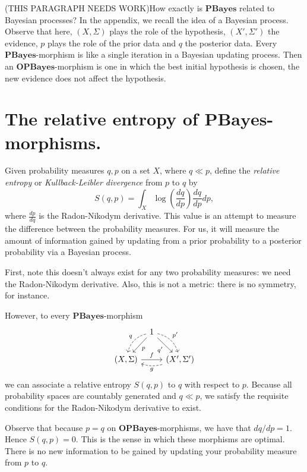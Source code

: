 \documentclass[11pt]{amsart}
\newcommand{\cat}[1]{\mathbf{#1}}
\theoremstyle{remark}
\theoremstyle{definition}
\begin{document}
{\color{red} (THIS PARAGRAPH NEEDS WORK)}How 
exactly is $\cat{PBayes}$ related to 
Bayesian processes? In the 
appendix, we recall the idea of a Bayesian 
process.  Observe that here, 
$(X,\Sigma)$ plays the role of the hypothesis, 
$(X',\Sigma')$ the evidence, $p$ 
plays the role of the prior data and $q$ the 
posterior data. Every $\cat{PBayes}$-morphism 
is like a single iteration in a Bayesian 
updating process. Then an 
$\cat{OPBayes}$-morphism is one in 
which the best initial hypothesis is chosen, 
the new evidence does not affect 
the hypothesis.  


%
\section{The relative entropy of 
$\cat{PBayes}$-morphisms.}
%

Given probability measures $q,p$ on a set $X$, where $q \ll p$, define the \textit{relative entropy} or \textit{Kullback-Leibler divergence} from $p$ to $q$ by
\[
S(q,p) = \int_X \log \left( \frac{dq}{dp} \right) \frac{dq}{dp} dp,
\]
where $\frac{dp}{dq}$ is the Radon-Nikodym derivative. This value is an attempt to measure the difference between the probability measures. For us, it will measure the amount of information gained by updating from a prior probability to a posterior probability via a Bayesian process. 

First, note this doesn't always exist for any two probability measures: we need the Radon-Nikodym derivative.  Also, this is not a metric: there is no symmetry, for instance.  

However, to every $\cat{PBayes}$-morphism 
\[
\begin{tikzcd}[column sep=tiny]
{} & 
{1} \ar[dl,"p"] \ar[dr,swap,"q'"] \ar[dr,bend left=30,dashed,"p'"] 
\ar[dl,bend right=30,dashed,swap,"q"] & 
{} \\
{(X,\Sigma)} \ar[rr,"f"] & 
{} & 
{(X',\Sigma')} \ar[ll,dashed,bend left=15,"g"]
\end{tikzcd}
\]
we can associate a relative entropy $S(q,p)$ to $q$ with respect to $p$.  Because all probability spaces are countably generated and $q \ll p$, we satisfy the requisite conditions for the Radon-Nikodym derivative to exist.  

Observe that because $p=q$ on 
$\cat{OPBayes}$-morphisms, we have that 
$dq/dp=1$. 
Hence $S(q,p)=0$. This is the sense in which 
these morphisms are optimal.  
There is no new information to be gained by 
updating your probability measure 
from $p$ to $q$. 
\end{document}
